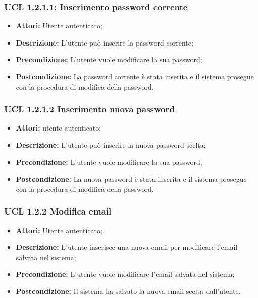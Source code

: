 \hypertarget{L1.2.1.1}{}
\subsubsection{UCL 1.2.1.1: Inserimento password corrente}
\begin{itemize}
	\item \textbf{Attori:} Utente autenticato;
	\item \textbf{Descrizione:} L'utente può inserire la password corrente;
	\item \textbf{Precondizione:} L'utente vuole modificare la sua password;
	\item \textbf{Postcondizione:} La password corrente è stata inserita e il sistema prosegue con la procedura di modifica della password.
\end{itemize}

\hypertarget{L1.2.1.2}{}
\subsubsection{UCL 1.2.1.2 Inserimento nuova password}
\begin{itemize}
	\item \textbf{Attori: } utente autenticato;
	\item \textbf{Descrizione:} L'utente può inserire la nuova password scelta;
	\item \textbf{Precondizione:} L'utente vuole modificare la sua password;
	\item \textbf{Postcondizione:} La nuova password è stata inserita e il sistema prosegue con la procedura di modifica della password.
\end{itemize}

\hypertarget{L1.2.2}{}
\subsubsection{UCL 1.2.2  Modifica email}
\begin{itemize}
\item \textbf{Attori:} Utente autenticato;
\item \textbf{Descrizione:} L'utente inserisce una nuova email per modificare l'email salvata nel sistema;
\item \textbf{Precondizione:} L'utente vuole modificare l'email salvata nel sistema;
\item \textbf{Postcondizione:} Il sistema ha salvato la nuova email scelta dall'utente.
\end{itemize}

